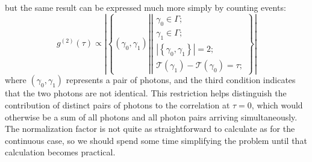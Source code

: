 \documentclass{article}
\newcommand{\braces}[1]{\ensuremath{\left\lbrace #1 \right\rbrace}}
\newcommand{\setbuilder}[2]{\ensuremath{\braces{#1 \left| #2 \right.}}}
\newcommand{\gn}[1]{\ensuremath{g^{(#1)}}}
\newcommand{\abs}[1]{\ensuremath{\left|#1\right|}}
\newcommand{\Time}{\ensuremath{\mathcal{T}}}
\newcommand{\photon}{\ensuremath{\gamma}}
\newcommand{\photons}{\ensuremath{\Gamma}}
\begin{document}
but the same result can be expressed much more simply by counting events:
\begin{equation}
\gn{2}(\tau) \propto \abs{\setbuilder
                                  {(\photon_{0},\photon_{1})}
                                  {\left|\begin{aligned}
                                        \photon_{0}\in\photons;\\
                                        \photon_{1}\in\photons;\\
                                        \abs{\braces{\photon_{0},\photon_{1}}}=2;\\
                                        \Time(\photon_{1})-\Time(\photon_{0})=\tau;
                                  \end{aligned}\right.}}
\end{equation}
where $(\photon_{0},\photon_{1})$ represents a pair of photons, and the third condition indicates that the two photons are not identical. This restriction helps distinguish the contribution of distinct pairs of photons to the correlation at $\tau=0$, which would otherwise be a sum of all photons and all photon pairs arriving simultaneously. The normalization factor is not quite as straightforward to calculate as for the continuous case, so we should spend some time simplifying the problem until that calculation becomes practical.
\end{document}
